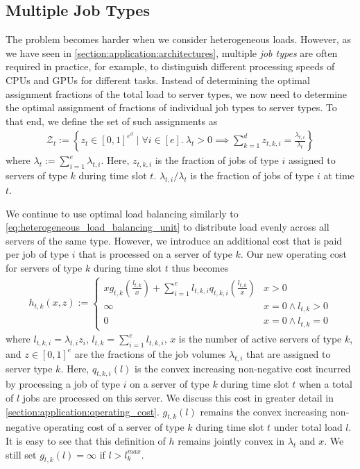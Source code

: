 \subsection{Multiple Job Types}\label{section:application:dispatching:multiple_load_types}

The problem becomes harder when we consider heterogeneous loads. However, as we have seen in \cref{section:application:architectures}, multiple \emph{job types} are often required in practice, for example, to distinguish different processing speeds of CPUs and GPUs for different tasks. Instead of determining the optimal assignment fractions of the total load to server types, we now need to determine the optimal assignment of fractions of individual job types to server types. To that end, we define the set of such assignments as \begin{align*}
    \mathcal{Z}_t := \left\{z_t \in [0,1]^{e^d} \mid \forall i \in [e].\ \lambda_t > 0 \implies \sum_{k=1}^d z_{t,k,i} = \frac{\lambda_{t,i}}{\lambda_t}\right\}
\end{align*} where $\lambda_t := \sum_{i=1}^e \lambda_{t,i}$. Here, $z_{t,k,i}$ is the fraction of jobs of type $i$ assigned to servers of type $k$ during time slot $t$. $\lambda_{t,i} / \lambda_t$ is the fraction of jobs of type $i$ at time $t$.

We continue to use optimal load balancing similarly to \cref{eq:heterogeneous_load_balancing_unit} to distribute load evenly across all servers of the same type. However, we introduce an additional cost that is paid per job of type $i$ that is processed on a server of type $k$. Our new operating cost for servers of type $k$ during time slot $t$ thus becomes \begin{align}\label{eq:multiple_load_types_load_balancing_unit}
    h_{t,k}(x,z) := \begin{cases}
        x g_{t,k}\left(\frac{l_{t,k}}{x}\right) + \sum_{i=1}^e l_{t,k,i} q_{t,k,i}\left(\frac{l_{t,k}}{x}\right) & x > 0 \\
        \infty                                                                                                   & x = 0 \land l_{t,k} > 0 \\
        0                                                                                                        & x = 0 \land l_{t,k} = 0
    \end{cases}
\end{align} where $l_{t,k,i} = \lambda_{t,i} z_i$, $l_{t,k} = \sum_{i=1}^e l_{t,k,i}$, $x$ is the number of active servers of type $k$, and $z \in [0,1]^e$ are the fractions of the job volumes $\lambda_{t,i}$ that are assigned to server type $k$. Here, $q_{t,k,i}(l)$ is the convex increasing non-negative cost incurred by processing a job of type $i$ on a server of type $k$ during time slot $t$ when a total of $l$ jobs are processed on this server. We discuss this cost in greater detail in \cref{section:application:operating_cost}. $g_{t,k}(l)$ remains the convex increasing non-negative operating cost of a server of type $k$ during time slot $t$ under total load $l$. It is easy to see that this definition of $h$ remains jointly convex in $\lambda_t$ and $x$. We still set $g_{t,k}(l) = \infty$ if $l > l_k^{max}$.

